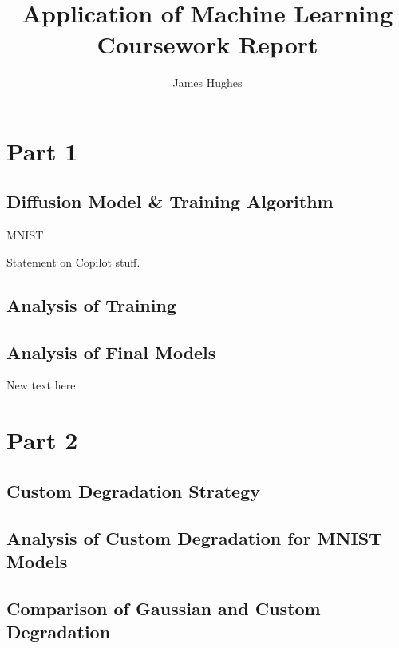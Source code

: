 \documentclass[12pt]{article}
\title{Application of Machine Learning Coursework Report}
\author{James Hughes}
\begin{document}
\maketitle
\newpage

\section*{Part 1}
\subsection*{Diffusion Model \& Training Algorithm}
MNIST \cite{mnist}

Statement on Copilot stuff.
\subsection*{Analysis of Training}
\subsection*{Analysis of Final Models}
New text here

\section*{Part 2}
\subsection*{Custom Degradation Strategy}
\subsection*{Analysis of Custom Degradation for MNIST Models}
\subsection*{Comparison of Gaussian and Custom Degradation}


\end{document}
